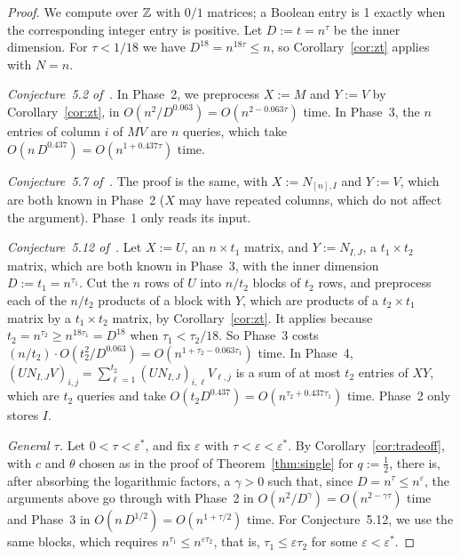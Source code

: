 \begin{proof}
We compute over $\mathbb{Z}$ with $0/1$ matrices; a Boolean entry is 1 exactly when the corresponding integer entry is positive. Let $D:=t=n^\tau$ be the inner dimension. For $\tau<1/18$ we have $D^{18}=n^{18\tau}\le n$, so Corollary~\ref{cor:zt} applies with $N=n$.

\emph{Conjecture~5.2 of~\cite{BNS19}.} In Phase~2, we preprocess $X:=M$ and $Y:=V$ by Corollary~\ref{cor:zt}, in $O(n^2/D^{0.063})=O(n^{2-0.063\tau})$ time. In Phase~3, the $n$ entries of column $i$ of $MV$ are $n$ queries, which take $O(n\,D^{0.437})=O(n^{1+0.437\tau})$ time.

\emph{Conjecture~5.7 of~\cite{BNS19}.} The proof is the same, with $X:=N_{[n],I}$ and $Y:=V$, which are both known in Phase~2 ($X$ may have repeated columns, which do not affect the argument). Phase~1 only reads its input.

\emph{Conjecture~5.12 of~\cite{BNS19}.} Let $X:=U$, an $n\times t_1$ matrix, and $Y:=N_{I,J}$, a $t_1\times t_2$ matrix, which are both known in Phase~3, with the inner dimension $D:=t_1=n^{\tau_1}$. Cut the $n$ rows of $U$ into $n/t_2$ blocks of $t_2$ rows, and preprocess each of the $n/t_2$ products of a block with $Y$, which are products of a $t_2\times t_1$ matrix by a $t_1\times t_2$ matrix, by Corollary~\ref{cor:zt}. It applies because $t_2=n^{\tau_2}\ge n^{18\tau_1}=D^{18}$ when $\tau_1<\tau_2/18$. So Phase~3 costs $(n/t_2)\cdot O(t_2^2/D^{0.063})=O(n^{1+\tau_2-0.063\tau_1})$ time. In Phase~4, $(UN_{I,J}V)_{i,j}=\sum_{\ell=1}^{t_2}(UN_{I,J})_{i,\ell}V_{\ell,j}$ is a sum of at most $t_2$ entries of $XY$, which are $t_2$ queries and take $O(t_2D^{0.437})=O(n^{\tau_2+0.437\tau_1})$ time. Phase~2 only stores $I$.

\emph{General $\tau$.} Let $0<\tau<\varepsilon^*$, and fix $\varepsilon$ with $\tau<\varepsilon<\varepsilon^*$. By Corollary~\ref{cor:tradeoff}, with $c$ and $\theta$ chosen as in the proof of Theorem~\ref{thm:single} for $q:=\frac12$, there is, after absorbing the logarithmic factors, a $\gamma>0$ such that, since $D=n^\tau\le n^\varepsilon$, the arguments above go through with Phase~2 in $O(n^2/D^\gamma)=O(n^{2-\gamma\tau})$ time and Phase~3 in $O(n\,D^{1/2})=O(n^{1+\tau/2})$ time. For Conjecture~5.12, we use the same blocks, which requires $n^{\tau_1}\le n^{\varepsilon\tau_2}$, that is, $\tau_1\le\varepsilon\tau_2$ for some $\varepsilon<\varepsilon^*$.
\end{proof}

